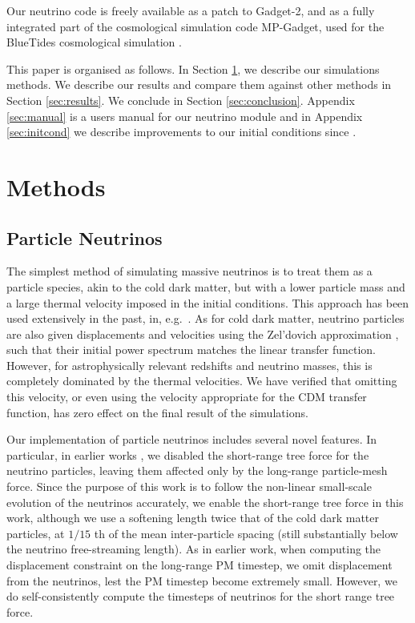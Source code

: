 \documentclass[useAMS, usenatbib]{mnras}
\begin{document}
Our neutrino code is freely available as a patch to Gadget-2, and as a fully integrated part of the cosmological simulation code MP-Gadget, used for the BlueTides cosmological simulation \cite{Feng_2015}.

This paper is organised as follows. In Section \ref{sec:methods}, we describe our simulations methods. We describe our
results and compare them against other methods in Section \ref{sec:results}. We conclude in Section \ref{sec:conclusion}. Appendix \ref{sec:manual} is a users manual for our neutrino module and in Appendix \ref{sec:initcond} we describe improvements to our initial conditions since \cite{AHB}.

\section{Methods}
\label{sec:methods}

\subsection{Particle Neutrinos}
\label{sec:particle}

The simplest method of simulating massive neutrinos is to treat them as a particle species, akin to the cold dark matter, but with a lower particle mass and a large thermal velocity imposed in the initial conditions. This approach has been used extensively in the past, in, e.g.~\citep{Brandbyge_2008, Bird_2012}. As for cold dark matter, neutrino particles are also given displacements and velocities using the Zel'dovich approximation \citep{Zeldovich_1970}, such that their initial power spectrum matches the linear transfer function. However, for astrophysically relevant redshifts and neutrino masses, this is completely dominated by the thermal velocities. We have verified that omitting this velocity, or even using the velocity appropriate for the CDM transfer function, has zero effect on the final result of the simulations.

Our implementation of particle neutrinos includes several novel features. In particular, in earlier works \citep{Bird_2012}, we disabled the short-range tree force for the neutrino particles, leaving them affected only by the long-range particle-mesh force. Since the purpose of this work is to follow the non-linear small-scale evolution of the neutrinos accurately, we enable the short-range tree force in this work, although we use a softening length
twice that of the cold dark matter particles, at $1/15$ th of the mean inter-particle spacing (still substantially below the neutrino free-streaming length). As in earlier work, when computing the displacement constraint on the long-range PM timestep, we omit displacement from the neutrinos, lest the PM timestep become extremely small. However, we do self-consistently compute the timesteps of neutrinos for the short range tree force.
\end{document}
